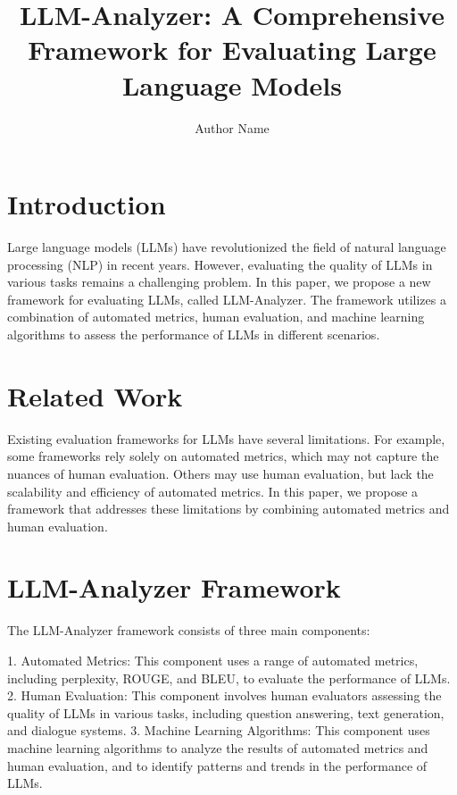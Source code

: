 \documentclass{article}
\begin{document}
\title{LLM-Analyzer: A Comprehensive Framework for Evaluating Large Language Models}

\author{Author Name}

\maketitle

\section{Introduction}

Large language models (LLMs) have revolutionized the field of natural language processing (NLP) in recent years. However, evaluating the quality of LLMs in various tasks remains a challenging problem. In this paper, we propose a new framework for evaluating LLMs, called LLM-Analyzer. The framework utilizes a combination of automated metrics, human evaluation, and machine learning algorithms to assess the performance of LLMs in different scenarios.

\section{Related Work}

Existing evaluation frameworks for LLMs have several limitations. For example, some frameworks rely solely on automated metrics, which may not capture the nuances of human evaluation. Others may use human evaluation, but lack the scalability and efficiency of automated metrics. In this paper, we propose a framework that addresses these limitations by combining automated metrics and human evaluation.

\section{LLM-Analyzer Framework}

The LLM-Analyzer framework consists of three main components:

1. Automated Metrics: This component uses a range of automated metrics, including perplexity, ROUGE, and BLEU, to evaluate the performance of LLMs.
2. Human Evaluation: This component involves human evaluators assessing the quality of LLMs in various tasks, including question answering, text generation, and dialogue systems.
3. Machine Learning Algorithms: This component uses machine learning algorithms to analyze the results of automated metrics and human evaluation, and to identify patterns and trends in the performance of LLMs.
\end{document}
